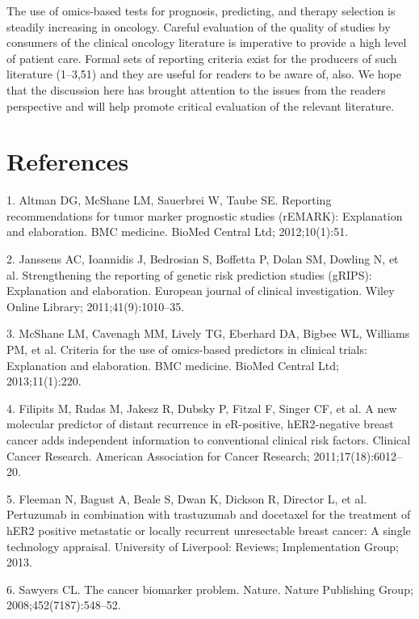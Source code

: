 \documentclass[11pt]{article}
\begin{document}
The use of omics-based tests for prognosis, predicting, and therapy
selection is steadily increasing in oncology. Careful evaluation of the
quality of studies by consumers of the clinical oncology literature is
imperative to provide a high level of patient care. Formal sets of
reporting criteria exist for the producers of such literature (1--3,51)
and they are useful for readers to be aware of, also. We hope that the
discussion here has brought attention to the issues from the readers
perspective and will help promote critical evaluation of the relevant
literature.

\section{References}\label{references}

\setlength{\parindent}{0pt}

1. Altman DG, McShane LM, Sauerbrei W, Taube SE. Reporting
recommendations for tumor marker prognostic studies (rEMARK):
Explanation and elaboration. BMC medicine. BioMed Central Ltd;
2012;10(1):51.

2. Janssens AC, Ioannidis J, Bedrosian S, Boffetta P, Dolan SM, Dowling
N, et al. Strengthening the reporting of genetic risk prediction studies
(gRIPS): Explanation and elaboration. European journal of clinical
investigation. Wiley Online Library; 2011;41(9):1010--35.

3. McShane LM, Cavenagh MM, Lively TG, Eberhard DA, Bigbee WL, Williams
PM, et al. Criteria for the use of omics-based predictors in clinical
trials: Explanation and elaboration. BMC medicine. BioMed Central Ltd;
2013;11(1):220.

4. Filipits M, Rudas M, Jakesz R, Dubsky P, Fitzal F, Singer CF, et al.
A new molecular predictor of distant recurrence in eR-positive,
hER2-negative breast cancer adds independent information to conventional
clinical risk factors. Clinical Cancer Research. American Association
for Cancer Research; 2011;17(18):6012--20.

5. Fleeman N, Bagust A, Beale S, Dwan K, Dickson R, Director L, et al.
Pertuzumab in combination with trastuzumab and docetaxel for the
treatment of hER2 positive metastatic or locally recurrent unresectable
breast cancer: A single technology appraisal. University of Liverpool:
Reviews; Implementation Group; 2013.

6. Sawyers CL. The cancer biomarker problem. Nature. Nature Publishing
Group; 2008;452(7187):548--52.
\end{document}
